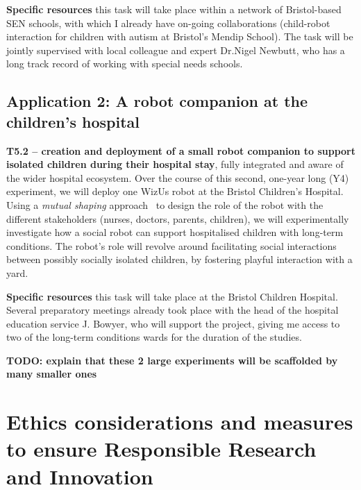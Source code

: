 \documentclass[11pt,a4paper]{report}
\newcommand{\project}{WizUs\xspace}
\newcommand{\TODO}[1]{{\color{red}\textbf{TODO: #1}}}
\begin{document}
\textbf{Specific resources} this task will take place within a network of
Bristol-based SEN schools, with which I already have on-going collaborations
(child-robot interaction for children with autism at Bristol's Mendip School).
The task will be jointly supervised with local colleague and expert Dr.Nigel Newbutt,
who has a long track record of working with special needs schools.





\subsection{Application 2: A robot companion at the children's hospital}
\textbf{T5.2 -- creation and deployment of a small robot companion to support
isolated children during their hospital stay}, fully integrated and aware of the
wider hospital ecosystem. Over the course of this second, one-year long (Y4)
experiment, we will deploy one \project robot at the Bristol Children's Hospital.
Using a \emph{mutual shaping} approach~\cite{winkle2018social} to design the
role of the robot with the different stakeholders (nurses, doctors, parents,
children), we will experimentally investigate how a social robot can support
hospitalised children with long-term conditions. The robot's role will revolve
around facilitating social interactions between possibly socially isolated
children, by fostering playful interaction with a yard.

\textbf{Specific resources} this task will take place at the Bristol Children
Hospital. Several preparatory meetings already took place with the head of the
hospital education service J. Bowyer, who will support the project, giving me
access to two of the long-term conditions wards for the duration of the studies.



\TODO{explain that these 2 large experiments will be scaffolded by many smaller
ones}


\section{Ethics considerations and measures to ensure Responsible Research and Innovation}
\end{document}
